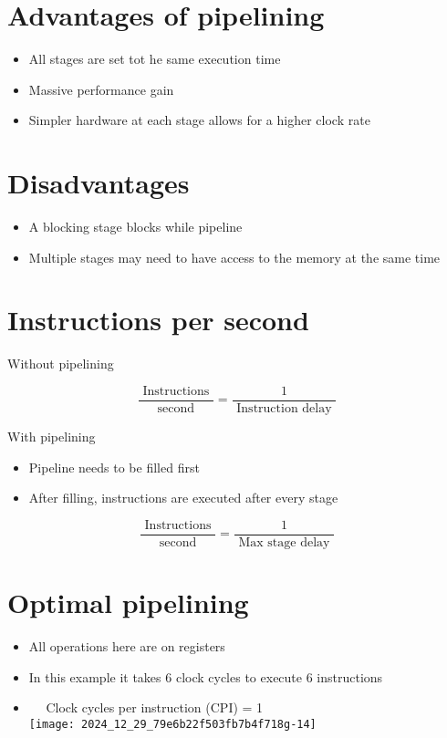     \section*{Advantages of pipelining}
    \begin{itemize}
      \item All stages are set tot he same execution time
      \item Massive performance gain
      \item Simpler hardware at each stage allows for a higher clock rate
    \end{itemize}
    
    \section*{Disadvantages}
    \begin{itemize}
      \item A blocking stage blocks while pipeline
      \item Multiple stages may need to have access to the memory at the same time
    \end{itemize}
    
    \section*{Instructions per second}
    Without pipelining
    
    $$
    \frac{\text { Instructions }}{\text { second }}=\frac{1}{\text { Instruction delay }}
    $$
    
    With pipelining
    
    \begin{itemize}
      \item Pipeline needs to be filled first
      \item After filling, instructions are executed after every stage
    \end{itemize}
    
    $$
    \frac{\text { Instructions }}{\text { second }}=\frac{1}{\text { Max stage delay }}
    $$
    
    \section*{Optimal pipelining}
    \begin{itemize}
      \item All operations here are on registers
      \item In this example it takes 6 clock cycles to execute 6 instructions
      \item $\quad$ Clock cycles per instruction (CPI) = 1\\
    \texttt{[image: 2024\_12\_29\_79e6b22f503fb7b4f718g-14]}
    \end{itemize}
    
